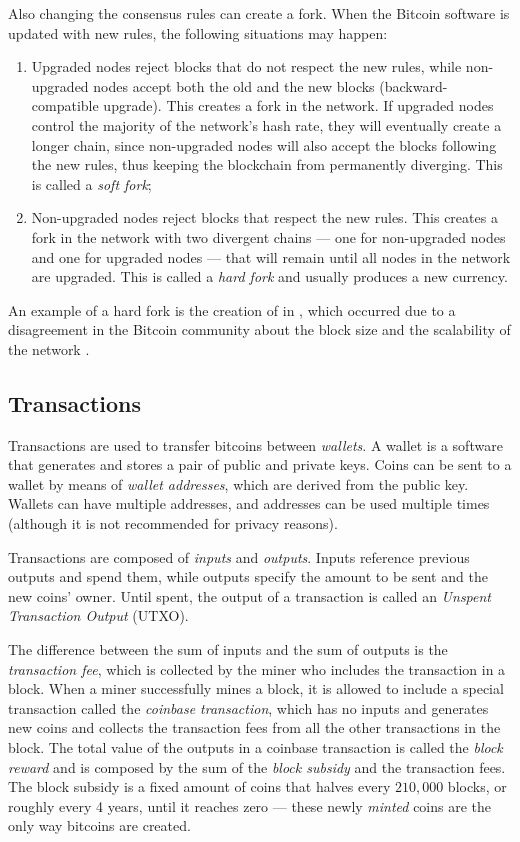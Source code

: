 Also changing the consensus rules can create a fork. When the Bitcoin software
is updated with new rules, the following situations may happen:
\begin{enumerate}
	\item Upgraded nodes reject blocks that do not respect the new rules,
		while non-upgraded nodes accept both the old and the new blocks
		(backward-compatible upgrade). This creates a fork in the
		network. If upgraded nodes control the majority of the
		network's hash rate, they will eventually create a longer
		chain, since non-upgraded nodes will also accept the blocks
		following the new rules, thus keeping the blockchain from
		permanently diverging. This is called a \emph{soft fork};
	\item Non-upgraded nodes reject blocks that respect the new rules. This
		creates a fork in the network with two divergent chains --- one
		for non-upgraded nodes and one for upgraded nodes --- that will
		remain until all nodes in the network are upgraded. This is
		called a \emph{hard fork} and usually produces a new currency.
\end{enumerate}

An example of a hard fork is the creation of  in
\citeyear{bitcoin-cash}, which occurred due to a disagreement in the Bitcoin
community about the block size and the scalability of the network
\cite{bitcoin-cash}.

\subsection{Transactions}\label{subsec:transactions}

Transactions are used to transfer bitcoins between \emph{wallets}. A wallet is
a software that generates and stores a pair of public and private keys. Coins
can be sent to a wallet by means of \emph{wallet addresses}, which are derived
from the public key. Wallets can have multiple addresses, and addresses can be
used multiple times (although it is not recommended for privacy reasons).

Transactions are composed of \emph{inputs} and \emph{outputs}. Inputs reference
previous outputs and spend them, while outputs specify the amount to be sent
and the new coins' owner. Until spent, the output of a transaction is called an
\emph{Unspent Transaction Output} (UTXO).

The difference between the sum of inputs and the sum of outputs is the
\emph{transaction fee}, which is collected by the miner who includes the
transaction in a block. When a miner successfully mines a block, it is allowed
to include a special transaction called the \emph{coinbase transaction}, which
has no inputs and generates new coins and collects the transaction fees from
all the other transactions in the block. The total value of the outputs in a
coinbase transaction is called the \emph{block reward} and is composed by the
sum of the \emph{block subsidy} and the transaction fees. The block subsidy is
a fixed amount of coins that halves every \(210,000\) blocks, or roughly every
4 years, until it reaches zero --- these newly \emph{minted} coins are the only
way bitcoins are created.

